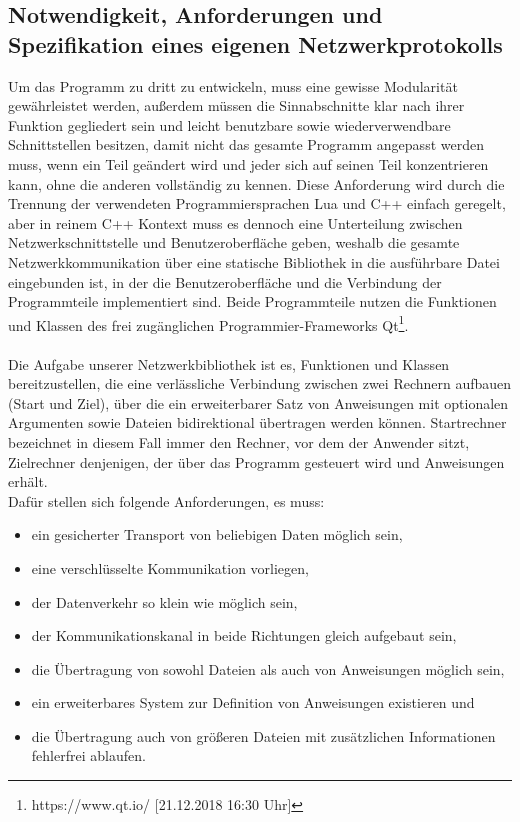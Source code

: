 \subsection{Notwendigkeit, Anforderungen und Spezifikation eines eigenen Netzwerkprotokolls}
Um das Programm zu dritt zu entwickeln, muss eine gewisse Modularität gewährleistet werden, außerdem müssen die Sinnabschnitte klar nach ihrer Funktion gegliedert sein und leicht benutzbare sowie wiederverwendbare Schnittstellen besitzen, damit nicht das gesamte Programm angepasst werden muss, wenn ein Teil geändert wird und jeder sich auf seinen Teil konzentrieren kann, ohne die anderen vollständig zu kennen.
Diese Anforderung wird durch die Trennung der verwendeten Programmiersprachen Lua und C++ einfach geregelt, aber in reinem C++ Kontext muss es dennoch eine Unterteilung zwischen Netzwerkschnittstelle und Benutzeroberfläche geben, weshalb die gesamte Netzwerkkommunikation über eine statische Bibliothek in die ausführbare Datei eingebunden ist, in der die Benutzeroberfläche und die Verbindung der Programmteile implementiert sind. Beide Programmteile nutzen die Funktionen und Klassen des frei zugänglichen Programmier-Frameworks Qt\footnote{https://www.qt.io/ [21.12.2018 16:30 Uhr]}.\\\\
Die Aufgabe unserer Netzwerkbibliothek ist es, Funktionen und Klassen bereitzustellen, die eine verlässliche Verbindung zwischen zwei Rechnern aufbauen (Start und Ziel), über die ein erweiterbarer Satz von Anweisungen mit optionalen Argumenten sowie Dateien bidirektional übertragen werden können.
Startrechner bezeichnet in diesem Fall immer den Rechner, vor dem der Anwender sitzt, Zielrechner denjenigen, der über das Programm gesteuert wird und Anweisungen erhält.\\
Dafür stellen sich folgende Anforderungen, es muss:\\

\begin{itemize}
\item ein gesicherter Transport von beliebigen Daten möglich sein,
\item eine verschlüsselte Kommunikation vorliegen,
\item der Datenverkehr so klein wie möglich sein,
\item der Kommunikationskanal in beide Richtungen gleich aufgebaut sein,
\item die Übertragung von sowohl Dateien als auch von Anweisungen möglich sein,
\item ein erweiterbares System zur Definition von Anweisungen existieren und
\item die Übertragung auch von größeren Dateien mit zusätzlichen Informationen fehlerfrei ablaufen.
\end{itemize}


